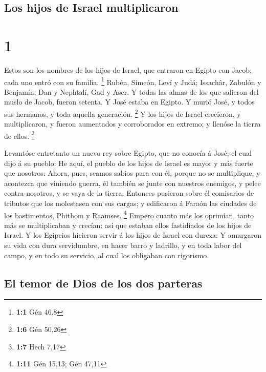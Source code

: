 \hypertarget{los-hijos-de-israel-multiplicaron}{%
\subsection{Los hijos de Israel
multiplicaron}\label{los-hijos-de-israel-multiplicaron}}

\hypertarget{section}{%
\section{1}\label{section}}

 Estos son los nombres de los hijos de Israel, que
entraron en Egipto con Jacob; cada uno entró con su familia. \footnote{\textbf{1:1}
  Gén 46,8}  Rubén, Simeón, Leví y Judá; 
Issachâr, Zabulón y Benjamín;  Dan y Nephtalí, Gad y Aser.
 Y todas las almas de los que salieron del muslo de Jacob,
fueron setenta. Y José estaba en Egipto.  Y murió José, y
todos sus hermanos, y toda aquella generación. \footnote{\textbf{1:6}
  Gén 50,26}  Y los hijos de Israel crecieron, y
multiplicaron, y fueron aumentados y corroborados en extremo; y llenóse
la tierra de ellos. \footnote{\textbf{1:7} Hech 7,17}

 Levantóse entretanto un nuevo rey sobre Egipto, que no
conocía á José; el cual dijo á su pueblo:  He aquí, el
pueblo de los hijos de Israel es mayor y más fuerte que nosotros:
 Ahora, pues, seamos sabios para con él, porque no se
multiplique, y acontezca que viniendo guerra, él también se junte con
nuestros enemigos, y pelee contra nosotros, y se vaya de la tierra.
 Entonces pusieron sobre él comisarios de tributos que
los molestasen con sus cargas; y edificaron á Faraón las ciudades de los
bastimentos, Phithom y Raamses. \footnote{\textbf{1:11} Gén 15,13; Gén
  47,11}  Empero cuanto más los oprimían, tanto más se
multiplicaban y crecían: así que estaban ellos fastidiados de los hijos
de Israel.  Y los Egipcios hicieron servir á los hijos de
Israel con dureza:  Y amargaron su vida con dura
servidumbre, en hacer barro y ladrillo, y en toda labor del campo, y en
todo su servicio, al cual los obligaban con rigorismo.

\hypertarget{el-temor-de-dios-de-los-dos-parteras}{%
\subsection{El temor de Dios de los dos
parteras}\label{el-temor-de-dios-de-los-dos-parteras}}


